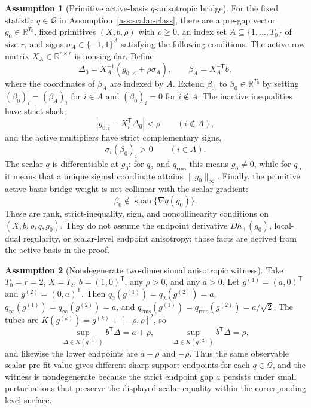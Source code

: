 \documentclass[11pt]{article}
\newcommand{\transpose}{\mathsf{T}}
\newcommand{\R}{\mathbb{R}}
\theoremstyle{definition}
\newtheorem{assumption}{Assumption}
\theoremstyle{plain}
\theoremstyle{remark}
\begin{document}
\begin{assumption}[Primitive active-basis \(q\)-anisotropic bridge]\label{ass:anisotropic}
For the fixed statistic \(q\in\mathcal Q\) in
Assumption~\ref{ass:scalar-class}, there are a pre-gap vector
\(g_0\in\R^{T_0}\), fixed primitives \((X,b,\rho)\) with \(\rho\ge0\), an index
set \(A\subseteq\{1,\ldots,T_0\}\) of size \(r\), and signs
\(\sigma_A\in\{-1,1\}^A\) satisfying the following conditions.  The active row
matrix \(X_A\in\R^{r\times r}\) is nonsingular.  Define
\[
\Delta_0=X_A^{-1}(g_{0,A}+\rho\sigma_A),\qquad
\beta_A=X_A^{-\transpose}b,
\]
where the coordinates of \(\beta_A\) are indexed by \(A\).  Extend
\(\beta_A\) to \(\beta_0\in\R^{T_0}\) by setting
\((\beta_0)_i=(\beta_A)_i\) for \(i\in A\) and \((\beta_0)_i=0\) for
\(i\notin A\).  The inactive inequalities have strict slack,
\[
|g_{0,i}-X_i^\transpose\Delta_0|<\rho\qquad(i\notin A),
\]
and the active multipliers have strict complementary signs,
\[
\sigma_i(\beta_0)_i>0\qquad(i\in A).
\]
The scalar \(q\) is differentiable at \(g_0\): for \(q_2\) and
\(q_{\mathrm{rms}}\) this means \(g_0\ne0\), while for \(q_\infty\) it means
that a unique signed coordinate attains \(\|g_0\|_\infty\).  Finally, the
primitive active-basis bridge weight is not collinear with the scalar gradient:
\[
\beta_0\notin\operatorname{span}\{\nabla q(g_0)\}.
\]
These are rank, strict-inequality, sign, and noncollinearity conditions on
\((X,b,\rho,q,g_0)\).  They do not assume the endpoint derivative
\(Dh_+(g_0)\), local-dual regularity, or scalar-level endpoint anisotropy; those
facts are derived from the active basis in the proof.
\end{assumption}

\begin{assumption}[Nondegenerate two-dimensional anisotropic witness]\label{ass:two-dimensional-witness}
Take \(T_0=r=2\), \(X=I_2\), \(b=(1,0)^\transpose\), any \(\rho>0\), and any
\(a>0\).  Let \(g^{(1)}=(a,0)^\transpose\) and \(g^{(2)}=(0,a)^\transpose\).
Then \(q_2(g^{(1)})=q_2(g^{(2)})=a\),
\(q_\infty(g^{(1)})=q_\infty(g^{(2)})=a\), and
\(q_{\mathrm{rms}}(g^{(1)})=q_{\mathrm{rms}}(g^{(2)})=a/\sqrt2\).  The tubes
are \(K(g^{(k)})=g^{(k)}+[-\rho,\rho]^2\), so
\[
\sup_{\Delta\in K(g^{(1)})}b^\transpose\Delta=a+\rho,\qquad
\sup_{\Delta\in K(g^{(2)})}b^\transpose\Delta=\rho,
\]
and likewise the lower endpoints are \(a-\rho\) and \(-\rho\).  Thus the same
observable scalar pre-fit value gives different sharp support endpoints for
each \(q\in\mathcal Q\), and the witness is nondegenerate because the strict
endpoint gap \(a\) persists under small perturbations that preserve the
displayed scalar equality within the corresponding level surface.
\end{assumption}
\end{document}

